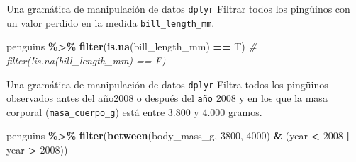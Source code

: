 \documentclass[
  ignorenonframetext,
  aspectratio=169]{beamer}
\newenvironment{Shaded}{\begin{snugshade}}{\end{snugshade}}
\newcommand{\CommentTok}[1]{\textcolor[rgb]{0.56,0.35,0.01}{\textit{#1}}}
\newcommand{\DecValTok}[1]{\textcolor[rgb]{0.00,0.00,0.81}{#1}}
\newcommand{\FunctionTok}[1]{\textcolor[rgb]{0.13,0.29,0.53}{\textbf{#1}}}
\newcommand{\NormalTok}[1]{#1}
\newcommand{\SpecialCharTok}[1]{\textcolor[rgb]{0.81,0.36,0.00}{\textbf{#1}}}
\begin{document}
\begin{frame}[fragile]{Una gramática de manipulación de datos
\texttt{dplyr}}
\label{una-gramuxe1tica-de-manipulaciuxf3n-de-datos-dplyr-2}
Filtrar todos los pingüinos con un valor perdido en la medida
\texttt{bill\_length\_mm}.

\begin{Shaded}
\begin{Highlighting}[]
\NormalTok{penguins }\SpecialCharTok{\%\textgreater{}\%} 
  \FunctionTok{filter}\NormalTok{(}\FunctionTok{is.na}\NormalTok{(bill\_length\_mm) }\SpecialCharTok{==}\NormalTok{ T)}
  \CommentTok{\# filter(!is.na(bill\_length\_mm) == F)}
\end{Highlighting}
\end{Shaded}
\end{frame}

\begin{frame}[fragile]{Una gramática de manipulación de datos
\texttt{dplyr}}
\label{una-gramuxe1tica-de-manipulaciuxf3n-de-datos-dplyr-3}
Filtra todos los pingüinos observados antes del año2008 o después del
\texttt{año} 2008 y en los que la masa corporal
(\texttt{masa\_cuerpo\_g}) está entre 3.800 y 4.000 gramos.

\begin{Shaded}
\begin{Highlighting}[]
\NormalTok{penguins }\SpecialCharTok{\%\textgreater{}\%} 
  \FunctionTok{filter}\NormalTok{(}\FunctionTok{between}\NormalTok{(body\_mass\_g, }\DecValTok{3800}\NormalTok{, }\DecValTok{4000}\NormalTok{) }\SpecialCharTok{\&}\NormalTok{ (year }\SpecialCharTok{\textless{}} \DecValTok{2008} \SpecialCharTok{|}\NormalTok{ year }\SpecialCharTok{\textgreater{}} \DecValTok{2008}\NormalTok{))}
\end{Highlighting}
\end{Shaded}
\end{frame}
\end{document}
